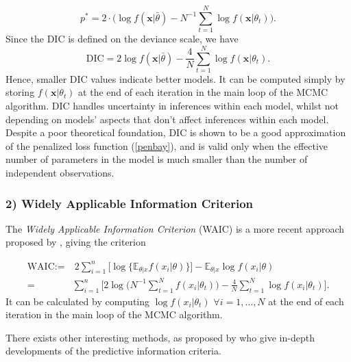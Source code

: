 \begin{equation*}
p^*=2\cdot \bigg(\log f(\boldsymbol{x}|\bar{\theta})-N^{-1}\sum_{t=1}^N\log f(\boldsymbol{x}|\theta_t)\bigg).
\end{equation*}
Since the DIC is defined on the deviance scale, we have
\begin{equation}
\text{DIC}= 2\log f(\boldsymbol{x}|\bar{\theta}) - \frac{4}{N} \sum_{t=1}^N\log f(\boldsymbol{x}|\theta_t).
\end{equation}
Hence, smaller DIC values indicate better models. It can be computed simply by storing $f(\boldsymbol{x}|\theta_t) $ at the end of each iteration in the main loop of the MCMC algorithm. DIC
handles uncertainty in inferences within each model, whilst not depending on models' aspects that don’t affect inferences within each model. Despite a poor theoretical foundation, DIC is shown to be a good approximation of the penalized loss function (\ref{penbay}), and is valid only when the effective number of parameters in the model is much smaller than the number of independent observations.


\subsubsection*{2) Widely Applicable Information Criterion}

The \emph{Widely Applicable Information Criterion} (WAIC) is a more recent approach proposed by \citet{Watanabe_asymptotic_2010}, giving the criterion  


\begin{equation}
\begin{aligned}
\text{WAIC}:= & \ 2 \sum_{i=1}^n\Big[\log\big\{\mathbb{E}_{\theta|x}f(x_i|\theta)\big\}\Big]- \mathbb{E}_{\theta|x}\log f(x_i|\theta) \\
= &\sum_{i=1}^n\Bigg[2\log \bigg(N^{-1}\sum_{t=1}^N f(x_i|\theta_t)\bigg)-\frac{4}{N}\sum_{t=1}^N\log f(x_i|\theta_t)\Bigg].
\end{aligned}
\end{equation}
It can be calculated by computing $\log f(x_i|\theta_t)$ $\forall i=1,\ldots,N$ at the end of each iteration in the main loop of the MCMC algorithm.

There exists other interesting methods, as proposed by \citet{gelman_understanding_2014} who give in-depth developments of the predictive information criteria.

 




